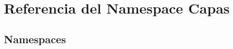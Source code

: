 \section{Referencia del Namespace Capas}
\label{namespace_capas}
\subsection*{Namespaces}
\begin{DoxyCompactItemize}
\end{DoxyCompactItemize}
